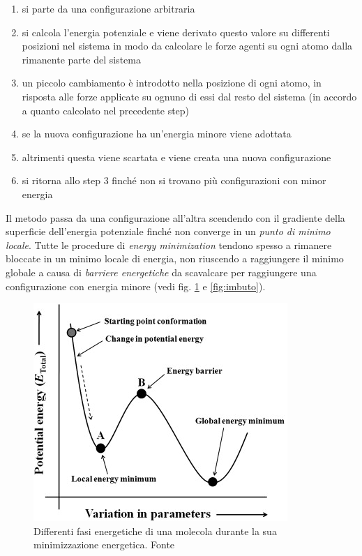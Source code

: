 {{\begin{enumerate}
	\item si parte da una configurazione arbitraria
	\item si calcola l'energia potenziale e viene derivato questo valore su differenti posizioni nel sistema in modo da calcolare le forze agenti su ogni atomo dalla rimanente parte del sistema
	\item un piccolo cambiamento è introdotto nella posizione di ogni atomo, in risposta alle forze applicate su ognuno di essi dal resto del sistema (in accordo a quanto calcolato nel precedente step)
	\item se la nuova configurazione ha un'energia minore viene adottata
	\item altrimenti questa viene scartata e viene creata una nuova configurazione
	\item si ritorna allo step 3 finché non si trovano più configurazioni con minor energia
\end{enumerate}

Il metodo passa da una configurazione all'altra scendendo con il gradiente della superficie dell'energia potenziale finché non converge in un \textit{punto di minimo locale}. Tutte le procedure di \textit{energy minimization }tendono spesso a rimanere bloccate in un minimo locale di energia, non riuscendo a raggiungere il minimo globale a causa di \textit{barriere energetiche} da scavalcare per raggiungere una configurazione con energia minore (vedi fig. \ref{fig:energy-minimization} e \ref{fig:imbuto}).

\begin{figure}[!htb]
	\centering
	\includegraphics[scale=1]{images/energy-minimzation.jpg}
	\caption{Differenti fasi energetiche di una molecola durante la sua minimizzazione energetica. Fonte\cite{ROY2015151}}
	\label{fig:energy-minimization}
\end{figure}

}}
